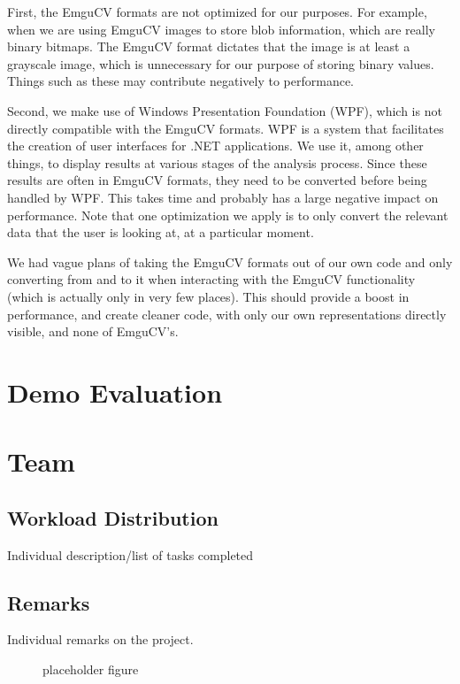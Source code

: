 \documentclass[10pt,twocolumn]{scrartcl}
\begin{document}
First, the EmguCV formats are not optimized for our purposes. For example, when we are using EmguCV images to store blob information, which are really binary bitmaps. The EmguCV format dictates that the image is at least a grayscale image, which is unnecessary for our purpose of storing binary values. Things such as these may contribute negatively to performance.

Second, we make use of Windows Presentation Foundation (WPF), which is not directly compatible with the EmguCV formats. WPF is a system that facilitates the creation of user interfaces for .NET applications. We use it, among other things, to display results at various stages of the analysis process. Since these results are often in EmguCV formats, they need to be converted before being handled by WPF. This takes time and probably has a large negative impact on performance. Note that one optimization we apply is to only convert the relevant data that the user is looking at, at a particular moment.

We had vague plans of taking the EmguCV formats out of our own code and only converting from and to it when interacting with the EmguCV functionality (which is actually only in very few places). This should provide a boost in performance, and create cleaner code, with only our own representations directly visible, and none of EmguCV's.

\section{Demo Evaluation}

\section{Team}

\subsection{Workload Distribution}
Individual description/list of tasks completed 

\subsection{Remarks}
Individual remarks on the project.

\begin{figure}[!b]
	  \begin{center}
	  \end{center}

  \caption{\small placeholder figure}
  \label{azahar2}
\end{figure}



\end{document}
